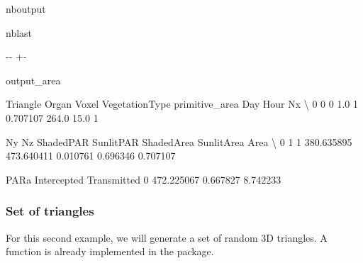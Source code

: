 \documentclass[letterpaper,10pt,english]{sphinxmanual}
\begin{document}
\begin{sphinxuseclass}{nboutput}
\begin{sphinxuseclass}{nblast}
{

\kern-\sphinxverbatimsmallskipamount\kern-\baselineskip
\kern+\FrameHeightAdjust\kern-\fboxrule
\vspace{\nbsphinxcodecellspacing}

\begin{sphinxuseclass}{output_area}
\begin{sphinxuseclass}{}


\begin{sphinxVerbatim}[commandchars=\\\{\}]
   Triangle  Organ  Voxel  VegetationType  primitive\_area    Day  Hour  Nx  \textbackslash{}
0         0      0    1.0               1        0.707107  264.0  15.0   1

   Ny  Nz   ShadedPAR   SunlitPAR  ShadedArea  SunlitArea      Area  \textbackslash{}
0   1   1  380.635895  473.640411    0.010761    0.696346  0.707107

         PARa  Intercepted  Transmitted
0  472.225067     0.667827     8.742233
\end{sphinxVerbatim}



\end{sphinxuseclass}
\end{sphinxuseclass}
}

\end{sphinxuseclass}
\end{sphinxuseclass}

\subsubsection{Set of triangles}
\label{\detokenize{tool_basics:Set-of-triangles}}
\sphinxAtStartPar
For this second example, we will generate a set of random 3D triangles. A function is already implemented in the package.
\end{document}
